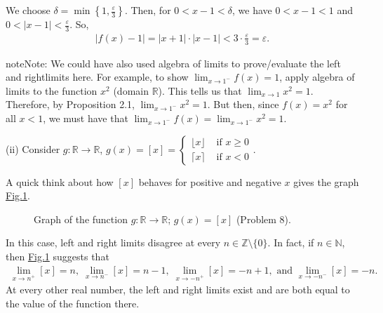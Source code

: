 \documentclass[letterpaper,10pt,english]{jupyterBook}
\let\sphinxpxdimen\pdfpxdimen\else\newdimen\sphinxpxdimen
\begin{document}
\sphinxAtStartPar
We choose \(\delta=\min\left\{1,\frac{\varepsilon}{3}\right\}\). Then, for \(0<x-1<\delta\), we have \(0<x-1<1\) and \(0<|x-1|<\frac{\varepsilon}{3}\). So,
\begin{equation*}
\begin{split}
|f(x)-1|=|x+1|\cdot|x-1| < 3\cdot\frac{\varepsilon}{3}=\varepsilon.
\end{split}
\end{equation*}
\begin{sphinxadmonition}{note}{Note:}
\sphinxAtStartPar
We could have also used algebra of limits to prove/evaluate the left\sphinxhyphen{} and right\sphinxhyphen{}limits here. For example, to show \(\lim_{x\rightarrow 1^-}f(x)=1\), apply algebra of limits to the function \(x^2\) (domain \(\mathbb{R}\)). This tells us that \(\lim_{x\rightarrow 1}x^2=1\). Therefore, by Proposition 2.1, \(\lim_{x\rightarrow 1^-}x^2=1\). But then, since \(f(x)=x^2\) for all \(x<1\), we must have that \(\lim_{x\rightarrow 1^-}f(x)=\lim_{x\rightarrow 1^-}x^2=1\).
\end{sphinxadmonition}

\sphinxAtStartPar
(ii) Consider \(g:\mathbb{R}\to\mathbb{R}\), \(g(x) = [x] = \left\{\begin{array}{cl} \lfloor x\rfloor & \text{ if } x\geq 0 \\ \lceil x \rceil & \text{ if } x<0 \end{array}\right.\).

\sphinxAtStartPar
A quick think about how \([x]\) behaves for positive and negative \(x\) gives the graph \hyperref[\detokenize{Solutions-upto46:intx}]{Fig.\@ \ref{\detokenize{Solutions-upto46:intx}}}.

\begin{figure}[htbp]
\centering
\capstart

\noindent\sphinxincludegraphics[width=400\sphinxpxdimen]{{[x]}.png}
\caption{Graph of the function \(g:\mathbb{R}\to\mathbb{R}\); \(g(x)=[x]\) (Problem 8).}\label{\detokenize{Solutions-upto46:intx}}\end{figure}

\sphinxAtStartPar
In this case, left and right limits disagree at every \(n \in \mathbb{Z}\setminus\{0\}\). In fact, if \(n\in\mathbb{N}\), then \hyperref[\detokenize{Solutions-upto46:intx}]{Fig.\@ \ref{\detokenize{Solutions-upto46:intx}}} suggests that
\begin{equation*}
\begin{split}
\lim_{x\rightarrow n^+}[x]=n, \;\lim_{x\rightarrow n^-}[x]=n-1, \; \lim_{x\rightarrow -n^+}[x]= -n+1, \text{ and } \lim_{x\rightarrow -n^-}[x]=-n.
\end{split}
\end{equation*}
\sphinxAtStartPar
At every other real number, the left and right limits exist and are both equal to the value of the function there.
\end{document}
